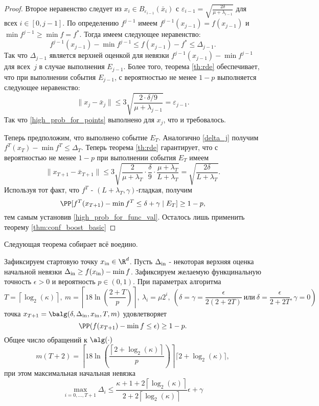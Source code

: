\begin{proof}
Второе неравенство следует из $x_i\in B_{\varepsilon_{i-1}}(\bar x_i)$ с $\varepsilon_{i-1}=\sqrt{\frac{2\delta}{\mu+\lambda_{i-1}}}$ для всех $i\in[0,j-1]$.
По определению $f^{j-1}$ имеем $f^{j-1}(x_{j-1})=f(x_{j-1})$ и $\min f^{j-1} \geq \min f=f^*$. Тогда имеем следующее неравенство:
\begin{equation}\label{eqn:verify_func_err}
f^{j-1}(x_{j-1})-\min f^{j-1}\leq f(x_{j-1})- f^*\leq \Delta_{j-1}.
\end{equation}
Так что $\Delta_{j-1}$ является верхней оценкой для невязки $f^{j-1}(x_{j-1})-\min f^{j-1}$ для всех~$j$ в случае выполнения $E_{j-1}$. 
Более того, теорема \eqref{th:rde} обеспечивает, что при выполнении события $E_{j-1}$, с вероятностью не менее $1-p$ выполняется следующее неравенство:
$$\|x_{j}-\bar x_{j}\|\leq 3\sqrt{\frac{2\cdot\delta/9}{\mu+\lambda_{j-1}}}=\varepsilon_{j-1}.$$
Так что  \eqref{high_prob_for_points} выполнено для $x_j$, что и требовалось.
	

Теперь предположим, что выполнено событие $E_T$. Аналогично \eqref{delta_j} получим
	$f^{T}(x_{T})-\min f^{T}\leq \Delta_T$. Теперь теорема \eqref{th:rde} гарантирует, что с вероятностью не менее $1-p$ при выполнении события $E_T$ имеем
	$$\|x_{T+1}-\bar x_{T+1}\|\leq 3\sqrt{\frac{2}{\mu+\lambda_{T}}\cdot \frac{\delta}{9}\cdot\frac{\mu+\lambda_T}{L+\lambda_T}}=\sqrt{\frac{2\delta}{L+\lambda_{T}}}.$$
Используя тот факт, что $f^T$  -  $(L+\lambda_T, \gamma)$-гладкая, 
получим $$\PP[f^T(x_{T+1})-\min f^T\leq \delta + \gamma \mid E_T]\geq 1-p,$$ тем самым установив \eqref{high_prob_for_func_val}. Осталось лишь применить теорему \eqref{thm:conf_boost_basic}
\end{proof}

Следующая теорема собирает всё воедино.

\begin{theorem}\label{th:main}
	Зафиксируем стартовую точку $x_{\rm in}\in \R^d$. Пусть $\Delta_{\rm in}$  - некоторая верхняя оценка начальной невязки $\Delta_{\rm in}\geq f(x_{\rm in})-\min f$. Зафиксируем желаемую функцинальную точность $\epsilon>0$ и вероятность $p\in (0,1)$. При параметрах алгоритма 
	 $$T=\left\lceil\log_2(\kappa)\right\rceil,\ m=\left\lceil18\ln\left(\frac{2+T}{p}\right)\right\rceil,\ \lambda_i=\mu 2^i, \ (\delta= \gamma = \frac{\epsilon}{2(2+2T)} \ \text{или} \  \delta= \frac{\epsilon}{2+2T}, \gamma = 0)$$
	точка  $x_{T+1}=\balg(\delta,\Delta_{\rm in}, x_{\rm in},T,m)$ удовлетворяет 
	$$\PP(f(x_{T+1})-\min f\leq \epsilon)\geq 1-p.$$ 
	Общее число обращений к  $\alg(\cdot)$ 
$$m(T + 2) = \left\lceil18\ln\left(\frac{\left\lceil 2+\log_2(\kappa)\right\rceil}{p}\right)\right\rceil\lceil 2+\log_2(\kappa)\rceil ,$$
при этом максимальная начальная невязка
$$\max_{i=0,\ldots,T+1}\Delta_{i}\leq \frac{\kappa+1+2\left\lceil \log_2(\kappa)\right\rceil}{2+2\left\lceil\log_2(\kappa)\right\rceil} \epsilon + \gamma$$
\end{theorem}

